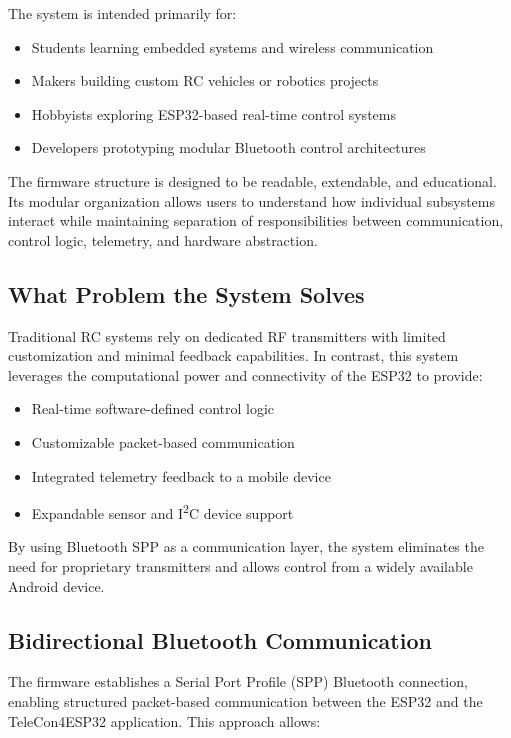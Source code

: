 The system is intended primarily for:

\begin{itemize}
	\item Students learning embedded systems and wireless communication
	\item Makers building custom RC vehicles or robotics projects
	\item Hobbyists exploring ESP32-based real-time control systems
	\item Developers prototyping modular Bluetooth control architectures
\end{itemize}

The firmware structure is designed to be readable, extendable, and educational. Its modular organization allows users to understand how individual subsystems interact while maintaining separation of responsibilities between communication, control logic, telemetry, and hardware abstraction.

\subsection{What Problem the System Solves}

Traditional RC systems rely on dedicated RF transmitters with limited customization and minimal feedback capabilities. In contrast, this system leverages the computational power and connectivity of the ESP32 to provide:

\begin{itemize}
	\item Real-time software-defined control logic
	\item Customizable packet-based communication
	\item Integrated telemetry feedback to a mobile device
	\item Expandable sensor and I\textsuperscript{2}C device support
\end{itemize}

By using Bluetooth SPP as a communication layer, the system eliminates the need for proprietary transmitters and allows control from a widely available Android device.

\subsection{Bidirectional Bluetooth Communication}

The firmware establishes a Serial Port Profile (SPP) Bluetooth connection, enabling structured packet-based communication between the ESP32 and the TeleCon4ESP32 application. This approach allows:

